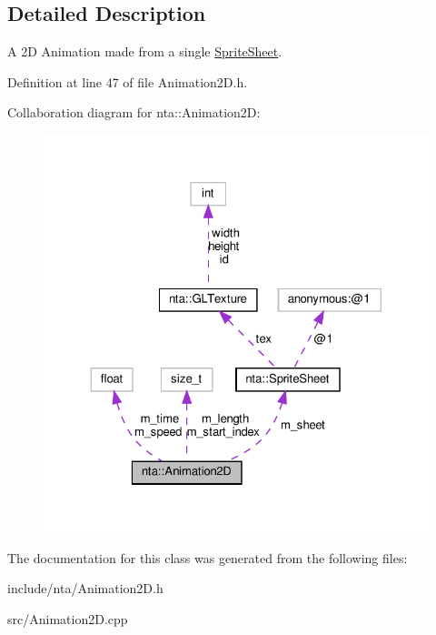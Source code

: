 \subsection{Detailed Description}
A 2D Animation made from a single \hyperlink{structnta_1_1SpriteSheet}{Sprite\+Sheet}. 

Definition at line 47 of file Animation2\+D.\+h.



Collaboration diagram for nta\+:\+:Animation2D\+:
\nopagebreak
\begin{figure}[H]
\begin{center}
\leavevmode
\includegraphics[width=324pt]{db/d21/classnta_1_1Animation2D__coll__graph}
\end{center}
\end{figure}


The documentation for this class was generated from the following files\+:\begin{DoxyCompactItemize}
\item 
include/nta/Animation2\+D.\+h\item 
src/Animation2\+D.\+cpp\end{DoxyCompactItemize}
